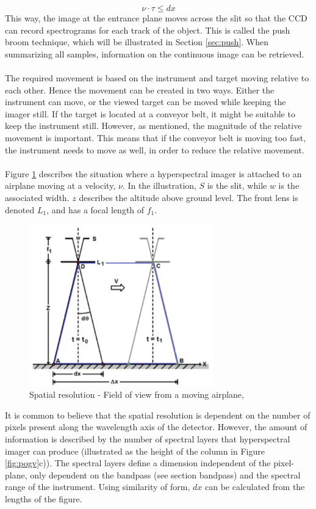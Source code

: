 \begin{equation}
    \nu \cdot \tau \leq dx
    \label{eq:req}
\end{equation}
This way, the image at the entrance plane moves across the slit so that the CCD can record spectrograms for each track of the object. This is called the push broom technique, which will be illustrated in Section \ref{sec:push}. When summarizing all samples, information on the continuous image can be retrieved.
\\\\
The required movement is based on the instrument and target moving relative to each other. Hence the movement can be created in two ways. Either the instrument can move, or the viewed target can be moved while keeping the imager still. If the target is located at a conveyor belt, it might be suitable to keep the instrument still. However, as mentioned, the magnitude of the relative movement is important. This means that if the conveyor belt is moving too fast, the instrument needs to move as well, in order to reduce the relative movement.
\\\\
Figure \ref{fig:spatialres} describes the situation where a hyperspectral imager is attached to an airplane moving at a velocity, $\nu$. In the illustration, $S$ is the slit, while $w$ is the associated width. $z$ describes the altitude above ground level. The front lens is denoted $L_1$, and has a focal length of $f_1$. 
\begin{figure}[H]
    \centering
    \includegraphics[height=7cm]{Images/theory/spatialres.png}
    \caption[Spatial Resolution]{Spatial resolution - Field of view from a moving airplane, \cite{sigernes2018}}
    \label{fig:spatialres}
\end{figure}
\noindent
It is common to believe that the spatial resolution is dependent on the number of pixels present along the wavelength axis of the detector. However, the amount of information is described by the number of spectral layers that hyperspectral imager can produce (illustrated as the height of the column in Figure \ref {fig:pogv}c)). The spectral layers define a dimension independent of the pixel-plane, only dependent on the bandpass (see section bandpass) and the spectral range of the instrument. Using similarity of form, $dx$ can be calculated from the lengths of the figure.
